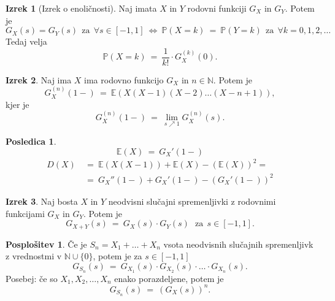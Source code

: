 \documentclass[11pt]{article}
\theoremstyle{definition}
\theoremstyle{definition}
\theoremstyle{definition}
\newtheorem{izrek}{Izrek}[section]
\newtheorem*{posledica}{Posledica}
\newtheorem*{posplošitev}{Posplošitev}
\begin{document}
\begin{izrek}[Izrek o enoličnosti]

Naj imata $X$ in $Y$ rodovni funkciji $G_X$ in $G_Y$. Potem je
$$G_X(s) = G_Y(s) ~~\text{za}~~ \forall s \in [-1, 1] ~\Leftrightarrow~ \mathbb{P}(X=k) ~=~ \mathbb{P}(Y=k) ~~\text{za}~~ \forall k = 0, 1, 2, \ldots $$
Tedaj velja
$$\mathbb{P}(X = k) ~=~ \frac{1}{k!} \cdot G_X^{(k)}(0).$$

\end{izrek}
\vspace{0.5cm}

\begin{izrek}

Naj ima $X$ ima rodovno funkcijo $G_X$ in $n \in \mathbb{N}$. Potem je 
$$G_X^{(n)}(1-) ~=~ \mathbb{E}(X(X-1)(X-2)\ldots(X-n+1)),$$
kjer je 
$$G_X^{(n)}(1-) ~=~ \lim_{s \nearrow 1} G_X^{(n)}(s).$$

\end{izrek}
\vspace{0.5cm}

\begin{posledica}

$$\mathbb{E}(X) ~=~ G_X'(1-)$$
\begin{align*}
	D(X) ~&=~ \mathbb{E}(X(X-1)) + \mathbb{E}(X) - (\mathbb{E}(X))^2 = \\
	&=~ G_X''(1-) + G_X'(1-) - (G_X'(1-))^2
\end{align*}

\end{posledica}
\vspace{0.5cm}

\begin{izrek}

Naj bosta $X$ in $Y$ neodvisni slučajni spremenljivki z rodovnimi funkcijami $G_X$ in $G_Y$. Potem je 
$$G_{X+Y}(s) ~=~ G_X(s) \cdot G_Y(s) ~~~\text{za}~~ s \in [-1, 1].$$

\end{izrek}
\vspace{0.5cm}

\begin{posplošitev}

Če je $S_n = X_1 + \ldots + X_n$ vsota neodvisnih slučajnih spremenljivk z vrednostmi v $\mathbb{N} \cup \{0\}$, potem je za $s \in [-1, 1]$
$$G_{S_n}(s) ~=~ G_{X_1}(s) \cdot G_{X_2}(s) \cdot \ldots \cdot G_{X_n}(s).$$
Posebej: če so $X_1, X_2, \ldots, X_n$ enako porazdeljene, potem je
$$G_{S_n}(s) ~=~ (G_X(s))^n.$$ 

\end{posplošitev}
\vspace{0.5cm}
\end{document}
